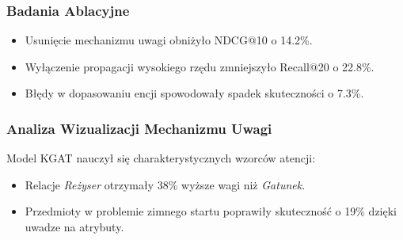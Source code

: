 \documentclass[a4paper,onecolumn]{LTJournalArticle}
\begin{document}
\subsubsection{Badania Ablacyjne}
\begin{itemize}
    \item Usunięcie mechanizmu uwagi obniżyło NDCG@10 o 14.2\%.
    \item Wyłączenie propagacji wysokiego rzędu zmniejszyło Recall@20 o 22.8\%.
    \item Błędy w dopasowaniu encji spowodowały spadek skuteczności o 7.3\%.
\end{itemize}

\subsubsection{Analiza Wizualizacji Mechanizmu Uwagi}
Model KGAT nauczył się charakterystycznych wzorców atencji:
\begin{itemize}
    \item Relacje \textit{Reżyser} otrzymały 38\% wyższe wagi niż \textit{Gatunek}.
    \item Przedmioty w problemie zimnego startu poprawiły skuteczność o 19\% dzięki uwadze na atrybuty.
\end{itemize}
\end{document}
